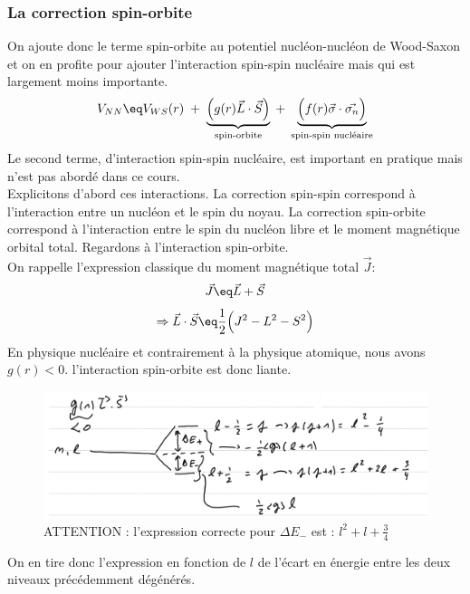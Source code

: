 \subsubsection{La correction spin-orbite}
On ajoute donc le terme spin-orbite au potentiel nucléon-nucléon de Wood-Saxon et on en profite pour ajouter l'interaction spin-spin nucléaire mais qui est largement moins importante.
\begin{equation*}
    V_{NN}\eq V_{WS}(r) 
    \; + \; \underbrace{\Big(g(r)\vec{L}\cdot\vec{S}\Big)}_\text{spin-orbite}
    \; + \; \underbrace{\Big(f(r)\vec{\sigma}\cdot\vec{\sigma_n}\Big)}_\text{spin-spin nucléaire}
\end{equation*}
Le second terme, d'interaction spin-spin nucléaire, est important en pratique mais n'est pas abordé dans ce cours.\\
Explicitons d'abord ces interactions. La correction spin-spin correspond à l'interaction entre un nucléon et le spin du noyau. La correction spin-orbite correspond à l'interaction entre le spin du nucléon libre et le moment magnétique orbital total. Regardons à l'interaction spin-orbite.\\
On rappelle l'expression classique du moment magnétique total $\vec{J} :$
\begin{equation*}
    \vec{J} \eq \vec{L} + \vec{S}
\end{equation*}
\begin{equation*}
    \Rightarrow \vec{L}\cdot\vec{S} \eq \frac{1}{2} \Big(J^2 - L^2 - S^2\Big)
\end{equation*}
En physique nucléaire et contrairement à la physique atomique, nous avons $g(r) < 0$. l'interaction spin-orbite est donc liante.\\
\begin{figure}
    \centering
    \includegraphics[scale = 0.7]{Images4/spin-orbite_dégén.PNG}
    \caption{ATTENTION : l'expression correcte pour $\Delta E_-$ est : $l^2 + l +\frac{3}{4}$}
\end{figure}
On en tire donc l'expression en fonction de $l$ de l'écart en énergie entre les deux niveaux précédemment dégénérés.
